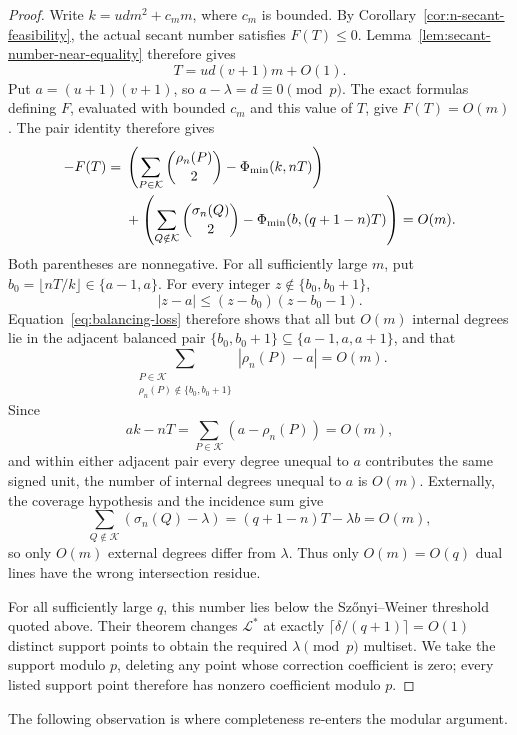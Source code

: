 \begin{proof}
Write \(k=udm^2+c_m m\), where \(c_m\) is bounded.  By
Corollary~\ref{cor:n-secant-feasibility}, the actual secant number satisfies
\(F(T)\le0\).  Lemma~\ref{lem:secant-number-near-equality} therefore gives
\[
 T=ud(v+1)m+O(1).
\]
Put \(a=(u+1)(v+1)\), so \(a-\lambda=d\equiv0\pmod p\).
The exact formulas defining \(F\), evaluated with bounded \(c_m\) and this
value of \(T\), give \(F(T)=O(m)\).  The pair identity therefore gives
\[
 \begin{aligned}
 -F(T)={}&
 \left(\sum_{P\in\mathcal K}\binom{\rho_n(P)}2-\Phi_{\min}(k,nT)\right)\\
 &+\left(\sum_{Q\notin\mathcal K}\binom{\sigma_n(Q)}2
              -\Phi_{\min}(b,(q+1-n)T)\right)=O(m).
 \end{aligned}
\]
Both parentheses are nonnegative.  For all sufficiently large \(m\), put
\(b_0=\lfloor nT/k\rfloor\in\{a-1,a\}\).  For every integer
\(z\notin\{b_0,b_0+1\}\),
\[
 |z-a|\le (z-b_0)(z-b_0-1).
\]
Equation~\eqref{eq:balancing-loss} therefore shows that all but \(O(m)\)
internal degrees lie in the adjacent balanced pair
\(\{b_0,b_0+1\}\subseteq\{a-1,a,a+1\}\), and that
\[
 \sum_{\substack{P\in\mathcal K\\
        \rho_n(P)\notin\{b_0,b_0+1\}}}
 |\rho_n(P)-a|=O(m).
\]
Since
\[
 ak-nT=\sum_{P\in\mathcal K}(a-\rho_n(P))=O(m),
\]
and within either adjacent pair every degree unequal to \(a\) contributes
the same signed unit, the number of internal degrees unequal to \(a\) is
\(O(m)\).  Externally,
the coverage hypothesis and the incidence sum give
\[
 \sum_{Q\notin\mathcal K}(\sigma_n(Q)-\lambda)
 =(q+1-n)T-\lambda b=O(m),
\]
so only \(O(m)\) external degrees differ from \(\lambda\).  Thus only
\(O(m)=O(q)\) dual lines have the wrong intersection residue.

For all sufficiently large \(q\), this number lies below the
Sz\H{o}nyi--Weiner threshold quoted above.  Their theorem changes
\(\mathcal L^*\) at exactly \(\lceil\delta/(q+1)\rceil=O(1)\) distinct
support points to obtain the required \(\lambda\pmod p\) multiset.  We take
the support modulo \(p\), deleting any point whose correction coefficient is
zero; every listed support point therefore has nonzero coefficient modulo
\(p\).
\end{proof}

The following observation is where completeness re-enters the modular
argument.

